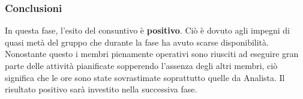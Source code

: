 \documentclass[../PianoProgetto.tex]{subfiles}
\begin{document}
	\subsubsection{Conclusioni}	
     In questa fase, l'esito del consuntivo è \textbf{positivo}. 
     Ciò è dovuto agli impegni di quasi metà del gruppo che durante la fase ha avuto scarse disponibilità. Nonostante questo i membri pienamente operativi sono riusciti ad eseguire gran parte delle attività pianificate sopperendo l'assenza degli altri membri, ciò significa che le ore sono state sovrastimate soprattutto quelle da Analista. Il risultato positivo sarà investito nella successiva fase.
    
     
\end{document}
